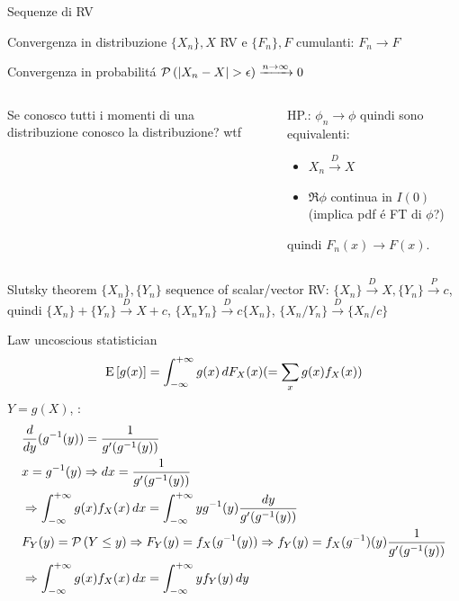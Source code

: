 \documentclass[asd-beamer.tex]{subfiles}%
\begin{document}
\begin{frame}{Sequenze di RV}\frameintoc
\begin{block}{Convergenza in distribuzione}
$\{X_n\}, X$ RV e $\{F_n\}, F$ cumulanti: $F_n\to F$
\end{block}
\begin{block}{Convergenza in probabilit\'a}
$\prob{(|X_n-X|>\epsilon)}\xrightarrow{n\to\infty}0$
\end{block}
\begin{block}{}
\begin{columns}[T]
	\begin{column}{0.3\textwidth}
		Se conosco tutti i momenti di una distribuzione conosco la distribuzione? wtf
	\end{column}
	\begin{column}{0.7\textwidth}
	HP.: $\phi_n\to\phi$ quindi sono equivalenti:
		\begin{itemize}
			\item $X_n\xrightarrow{D}X$
			\item $\Re{\phi}$ continua in $I(0)$ (implica pdf \'e FT di $\phi$?)
		\end{itemize}
		quindi $F_n(x)\to F(x)$.
	\end{column}
\end{columns}
\end{block}
\begin{block}{Slutsky theorem}
$\{X_n\},\{Y_n\}$ sequence of scalar/vector RV: $\{X_n\}\xrightarrow{D}X,\{Y_n\}\xrightarrow{P}c$, quindi $\{X_n\}+\{Y_n\}\xrightarrow{D}X+c$, $\{X_nY_n\}\xrightarrow{D}c\{X_n\}$, $\{X_n/Y_n\}\xrightarrow{D}\{X_n/c\}$
\end{block}
\end{frame}

\begin{frame}{Law uncoscious statistician}
	\begin{equation*}
	\operatorname{E}{[g(x)]}=\int_{-\infty}^{+\infty}{}g(x)\,dF_X(x)(=\sum_xg(x)f_X(x))
	\end{equation*}
	$Y=g(X)$, :
	\begin{align*}
	&\frac{d}{d y}({g}^{-1}(y))=\frac{1}{g'({g}^{-1}(y))}\\
	&x={g}^{-1}(y)\Rightarrow dx=\frac{1}{g'({g}^{-1}(y))}\\
	&\Rightarrow \int_{-\infty}^{+\infty}{}g(x)f_X(x)\,dx=\int_{-\infty}^{+\infty}{}y{g}^{-1}(y)\frac{dy}{g'({g}^{-1}(y))}\\
	&F_Y(y)=\operatorname{\mathcal{P}}{(Y\leq y)}\Rightarrow F_Y(y)=f_X({g}^{-1}(y))\Rightarrow f_Y(y)=f_X({g}^{-1})(y)\frac{1}{g'({g}^{-1}(y))}\\
	&\Rightarrow \int_{-\infty}^{+\infty}{}g(x)f_X(x)\,dx=\int_{-\infty}^{+\infty} yf_Y(y)\,dy
	\end{align*}
\end{frame}
\end{document}
